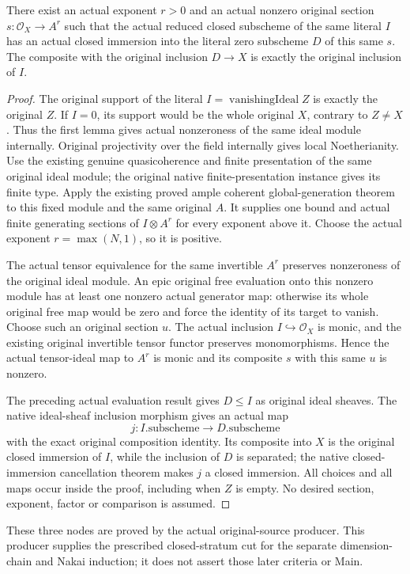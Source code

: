 \begin{theorem}
\label{thm:projective-original-ample-section-prescribed-closed-set}
\leanok
There exist an actual exponent $r>0$ and an actual nonzero original
section $s:\mathcal O_X\to A^r$ such that the actual reduced closed
subscheme of the same literal $I$ has an actual closed immersion into
the literal zero subscheme $D$ of this same $s$. The composite with the
original inclusion $D\to X$ is exactly the original inclusion of $I$.
\end{theorem}
\begin{proof}
The original support of the literal $I=\operatorname{vanishingIdeal}Z$
is exactly the original $Z$. If $I=0$, its support would be the whole
original $X$, contrary to $Z\ne X$. Thus the first lemma gives actual
nonzeroness of the same ideal module internally. Original projectivity
over the field internally gives local Noetherianity.
Use the existing genuine quasicoherence and finite presentation of the
same original ideal module; the original native finite-presentation
instance gives its finite type. Apply the existing proved ample coherent
global-generation theorem to this fixed module and the same original
$A$. It supplies one bound and actual finite generating sections of
$I\otimes A^r$ for every exponent above it. Choose the actual exponent
$r=\max(N,1)$, so it is positive.

The actual tensor equivalence for the same invertible $A^r$ preserves
nonzeroness of the original ideal module. An epic original free evaluation
onto this nonzero module has at least one nonzero actual generator map:
otherwise its whole original free map would be zero and force the
identity of its target to vanish. Choose such an original section $u$.
The actual inclusion $I\hookrightarrow\mathcal O_X$ is monic, and the
existing original invertible tensor functor preserves monomorphisms.
Hence the actual tensor-ideal map to $A^r$ is monic and its composite
$s$ with this same $u$ is nonzero.

The preceding actual evaluation result gives $D\le I$ as original ideal
sheaves. The native ideal-sheaf inclusion morphism gives an actual map
\[j:I.\mathrm{subscheme}\longrightarrow D.\mathrm{subscheme}\]
with the exact original composition identity. Its composite into $X$ is the original closed
immersion of $I$, while the inclusion of $D$ is separated; the native
closed-immersion cancellation theorem makes $j$ a closed immersion.
All choices and all maps occur inside the proof, including when $Z$ is
empty. No desired section, exponent, factor or comparison is assumed.
\end{proof}

These three nodes are proved by the actual original-source producer.
This producer supplies the prescribed closed-stratum cut for the
separate dimension-chain and Nakai induction; it does not assert those
later criteria or Main.
